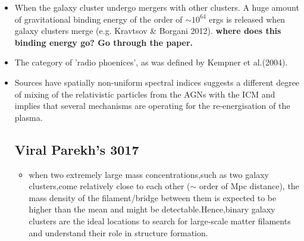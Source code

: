 \documentclass[11pt]{report}
\newcommand{\tbf}[1]{\textbf{#1}}
\begin{document}
\begin{itemize}
\item When the galaxy cluster undergo mergers with other clusters. A huge amount of gravitational binding energy of the order of $\sim 10^{64}$ ergs is released when galaxy clusters merge (e.g. Kravtsov $\&$ Borgani 2012). \tbf{where does this binding energy go? Go through the paper.}
\item The category of 'radio phoenices', as was defined by Kempner et al.(2004).\\
\item Sources have spatially non-uniform spectral indices suggests a different degree of mixing of the relativistic particles from the AGNs with the ICM and implies that several mechanisms are operating for the re-energisation of the plasma. 

\subsection{Viral Parekh's 3017}
\begin{itemize}
\item  when two extremely large mass concentrations,such as two galaxy clusters,come relatively close to each other ($\sim$ order of Mpc distance), the mass density of the filament/bridge between them is expected to be higher than the mean and might be detectable.Hence,binary galaxy clusters are the ideal locations to search for large-scale matter filaments and understand their role in structure formation. 


\end{itemize}
\end{itemize}
\end{document}
